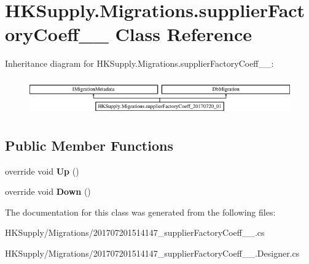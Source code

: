 \hypertarget{class_h_k_supply_1_1_migrations_1_1supplier_factory_coeff__20170720__01}{}\section{H\+K\+Supply.\+Migrations.\+supplier\+Factory\+Coeff\+\_\+\_ Class Reference}
\label{class_h_k_supply_1_1_migrations_1_1supplier_factory_coeff__20170720__01}
Inheritance diagram for H\+K\+Supply.\+Migrations.\+supplier\+Factory\+Coeff\+\_\+\_\+:\begin{figure}[H]
\begin{center}
\leavevmode
\includegraphics[height=1.613833cm]{class_h_k_supply_1_1_migrations_1_1supplier_factory_coeff__20170720__01}
\end{center}
\end{figure}
\subsection*{Public Member Functions}
\begin{DoxyCompactItemize}
\item 
\mbox{\label{class_h_k_supply_1_1_migrations_1_1supplier_factory_coeff__20170720__01_a0a861ac8e2fccec2cbc4b173e57cd272}} 
override void {\bfseries Up} ()
\item 
\mbox{\label{class_h_k_supply_1_1_migrations_1_1supplier_factory_coeff__20170720__01_a8875c4b7f540539a8e51e3396356dfe6}} 
override void {\bfseries Down} ()
\end{DoxyCompactItemize}


The documentation for this class was generated from the following files\+:\begin{DoxyCompactItemize}
\item 
H\+K\+Supply/\+Migrations/201707201514147\+\_\+supplier\+Factory\+Coeff\+\_\+\_.\+cs\item 
H\+K\+Supply/\+Migrations/201707201514147\+\_\+supplier\+Factory\+Coeff\+\_\+\_.\+Designer.\+cs\end{DoxyCompactItemize}
